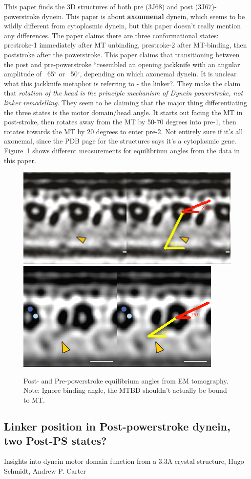\documentclass[10pt]{article} %
\begin{document}
This paper finds the 3D structures of both pre (3J68) and post (3J67)-powerstroke dynein. This paper is about \textbf{axonmenal} dynein, which seems to be wildly different from cytoplasmic dynein, but this paper doesn't really mention any differences. The paper claims there are three conformational states: prestroke-1 immediately after MT unbinding, prestroke-2 after MT-binding, then poststroke after the powerstroke. This paper claims that transitioning between the post and pre-powerstroke ``resembled an opening jackknife with an angular amplitude of ~65$^{\circ}$ or ~50$^{\circ}$, depending on which axonemal dynein. It is unclear what this jackknife metaphor is referring to - the linker?. They make the claim that \textit{rotation of the head is the principle mechanism of Dynein powerstroke, not linker remodelling}. They seem to be claiming that the major thing differentiating the three states is the motor domain/head angle. It starts out facing the MT in post-stroke, then rotates away from the MT by 50-70 degrees into pre-1, then rotates towards the MT by 20 degrees to enter pre-2. Not entirely sure if it's all axonemal, since the PDB page for the structures says it's a cytoplasmic gene.\\

Figure~\ref{fig:em_tomography_eq_angles} shows different measurements
for equilibrium angles from the data in this paper.
\begin{figure}[h!]
  \centering
  \includegraphics[width=.45\textwidth]{../figures/Post_powerstroke_tomography.jpg}
  \includegraphics[width=.45\textwidth]{../figures/Pre_powerstroke_tomography.jpg}
  \caption{Post- and Pre-powerstroke equilibrium angles from EM tomography. Note: Ignore binding angle, the MTBD shouldn't actually be bound to MT.}
  \label{fig:em_tomography_eq_angles}
\end{figure}

\subsection{Linker position in Post-powerstroke dynein, two Post-PS states?}
Insights into dynein motor domain function from a 3.3A crystal structure, Hugo Schmidt, Andrew P. Carter\\
\end{document}

